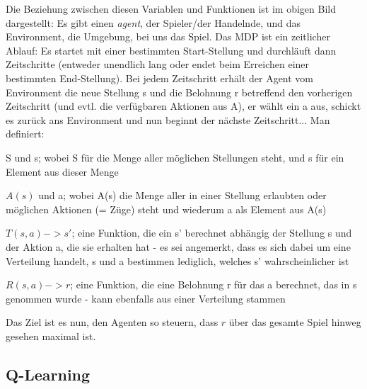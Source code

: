 \documentclass[12pt,a4paper]{article}
\begin{document}
Die Beziehung zwischen diesen Variablen und Funktionen ist im obigen Bild dargestellt: Es gibt einen \textit{agent}, der Spieler/der Handelnde, und das Environment, die Umgebung, bei uns das Spiel. Das MDP ist ein zeitlicher Ablauf: Es startet mit einer bestimmten Start-Stellung und durchläuft dann Zeitschritte (entweder unendlich lang oder endet beim Erreichen einer bestimmten End-Stellung). Bei jedem Zeitschritt erhält der Agent vom Environment die neue Stellung s und die Belohnung r betreffend den vorherigen Zeitschritt (und evtl. die verfügbaren Aktionen aus A), er wählt ein a aus, schickt es zurück ans Environment und nun beginnt der nächste Zeitschritt...
Man definiert:
\begin{description}
\item{S und s; wobei S für die Menge aller möglichen Stellungen steht, und s für ein Element aus dieser Menge}
\item{$A(s)$ und a; wobei A(s) die Menge aller in einer Stellung erlaubten oder möglichen Aktionen (= Züge) steht und wiederum a als Element aus A(s)}
\item{$T(s, a) -> s'$; eine Funktion, die ein s' berechnet abhängig der Stellung s und der Aktion a, die sie erhalten hat - es sei angemerkt, dass es sich dabei um eine Verteilung handelt, s und a bestimmen lediglich, welches s' wahrscheinlicher ist}
\item{$R(s, a) -> r$; eine Funktion, die eine Belohnung r für das a berechnet, das in s genommen wurde - kann ebenfalls aus einer Verteilung stammen}
\end{description}
Das Ziel ist es nun, den Agenten so steuern, dass $r$ über das gesamte Spiel hinweg gesehen maximal ist. 

\subsection{Q-Learning}
\end{document}
